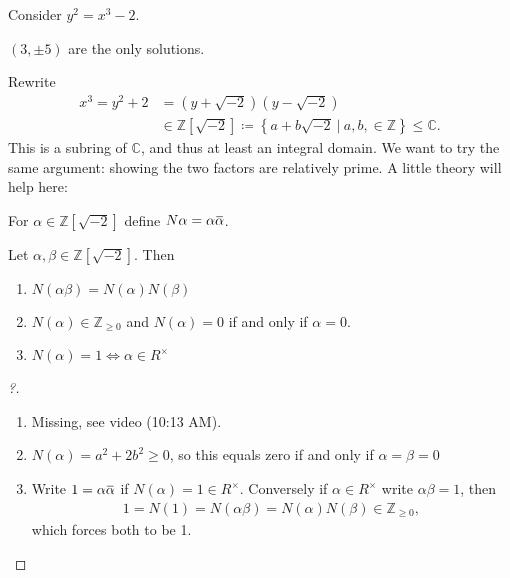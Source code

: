 \begin{example}[Fermat]

Consider \(y^2 = x^3-2\).

\begin{claim}

\((3, \pm 5)\) are the only solutions.

\end{claim}

Rewrite
\begin{align*}
x^3 = y^2+2 &= (y+ \sqrt{-2})(y - \sqrt{-2}) \\ 
&\in
{\mathbb{Z}}[\sqrt{-2}] \coloneqq\left\{{a+b\sqrt{-2} {~\mathrel{\Big|}~}a,b,\in {\mathbb{Z}}}\right\} \leq {\mathbb{C}}
.\end{align*}
This is a subring of \({\mathbb{C}}\), and thus at least an integral
domain. We want to try the same argument: showing the two factors are
relatively prime. A little theory will help here:

\begin{definition}

For \(\alpha\in {\mathbb{Z}}[\sqrt{-2}]\) define
\(N \alpha = \alpha\mkern 1.5mu\overline{\mkern-1.5mu\alpha\mkern-1.5mu}\mkern 1.5mu\).

\end{definition}

\begin{lemma}[?]

Let \(\alpha, \beta \in {\mathbb{Z}}[\sqrt{-2}]\). Then

\begin{enumerate}
\def\labelenumi{\arabic{enumi}.}
\item
  \(N(\alpha \beta) = N(\alpha) N(\beta)\)
\item
  \(N( \alpha) \in {\mathbb{Z}}_{\geq 0}\) and \(N(\alpha) = 0\) if and
  only if \(\alpha= 0\).
\item
  \(N(\alpha) = 1 \iff \alpha\in R^{\times}\)
\end{enumerate}

\end{lemma}

\begin{proof}[?]

\begin{enumerate}
\def\labelenumi{\arabic{enumi}.}
\item
  Missing, see video (10:13 AM).
\item
  \(N(\alpha) = a^2 + 2b^2 \geq 0\), so this equals zero if and only if
  \(\alpha= \beta= 0\)
\item
  Write
  \(1 = \alpha\mkern 1.5mu\overline{\mkern-1.5mu\alpha\mkern-1.5mu}\mkern 1.5mu\)
  if \(N(\alpha) = 1 \in R^{\times}\). Conversely if
  \(\alpha\in R^{\times}\) write \(\alpha \beta = 1\), then
  \begin{align*} 
  1 = N(1) = N(\alpha \beta) = N(\alpha ) N(\beta ) \in {\mathbb{Z}}_{\geq 0} 
  ,\end{align*}
  which forces both to be 1.
\end{enumerate}


\end{proof}
\end{example}
